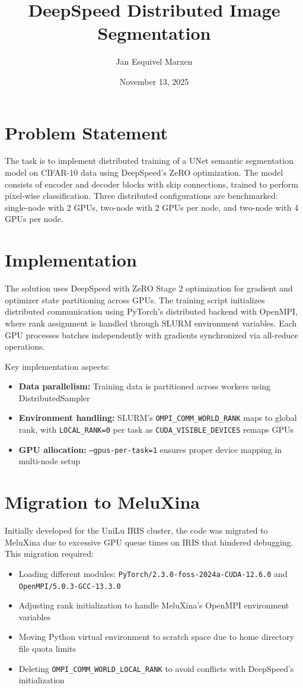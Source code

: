 \documentclass[12pt,a4paper]{article}
\title{DeepSpeed Distributed Image Segmentation}
\author{Jan Esquivel Marxen}
\date{November 13, 2025}
\begin{document}
\maketitle

\section{Problem Statement}
The task is to implement distributed training of a UNet semantic segmentation model on CIFAR-10 data using DeepSpeed's ZeRO optimization. The model consists of encoder and decoder blocks with skip connections, trained to perform pixel-wise classification. Three distributed configurations are benchmarked: single-node with 2 GPUs, two-node with 2 GPUs per node, and two-node with 4 GPUs per node.

\section{Implementation}
The solution uses DeepSpeed with ZeRO Stage 2 optimization for gradient and optimizer state partitioning across GPUs. The training script initializes distributed communication using PyTorch's distributed backend with OpenMPI, where rank assignment is handled through SLURM environment variables. Each GPU processes batches independently with gradients synchronized via all-reduce operations.

Key implementation aspects:
\begin{itemize}
    \item \textbf{Data parallelism:} Training data is partitioned across workers using DistributedSampler
    \item \textbf{Environment handling:} SLURM's \texttt{OMPI\_COMM\_WORLD\_RANK} maps to global rank, with \texttt{LOCAL\_RANK=0} per task as \texttt{CUDA\_VISIBLE\_DEVICES} remaps GPUs
    \item \textbf{GPU allocation:} \texttt{--gpus-per-task=1} ensures proper device mapping in multi-node setup
\end{itemize}

\section{Migration to MeluXina}
Initially developed for the UniLu IRIS cluster, the code was migrated to MeluXina due to excessive GPU queue times on IRIS that hindered debugging. This migration required:
\begin{itemize}
    \item Loading different modules: \texttt{PyTorch/2.3.0-foss-2024a-CUDA-12.6.0} and \texttt{OpenMPI/5.0.3-GCC-13.3.0}
    \item Adjusting rank initialization to handle MeluXina's OpenMPI environment variables
    \item Moving Python virtual environment to scratch space due to home directory file quota limits
    \item Deleting \texttt{OMPI\_COMM\_WORLD\_LOCAL\_RANK} to avoid conflicts with DeepSpeed's initialization
\end{itemize}
\end{document}
